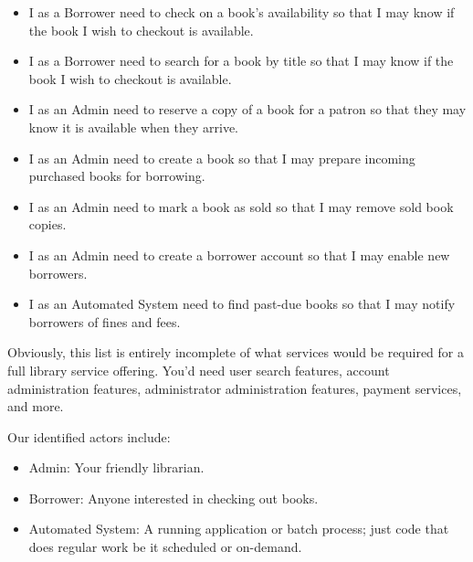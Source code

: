 \begin{itemize}
  \item I as a Borrower need to check on a book's availability so that I may know if the book I wish to checkout is available.
  \item I as a Borrower need to search for a book by title so that I may know if the book I wish to checkout is available.
  \item I as an Admin need to reserve a copy of a book for a patron so that they may know it is available when they arrive.
  \item I as an Admin need to create a book so that I may prepare incoming purchased books for borrowing.
  \item I as an Admin need to mark a book as sold so that I may remove sold book copies.
  \item I as an Admin need to create a borrower account so that I may enable new borrowers.
  \item I as an Automated System need to find past-due books so that I may notify borrowers of fines and fees.
\end{itemize}

Obviously, this list is entirely incomplete of what services would be required for a full library service offering.  You'd need user search features, account administration features, administrator administration features, payment services, and more.

Our identified actors include:

\begin{itemize}
  \item Admin: Your friendly librarian.
  \item Borrower: Anyone interested in checking out books.
  \item Automated System: A running application or batch process; just code that does regular work be it scheduled or on-demand.
\end{itemize}
